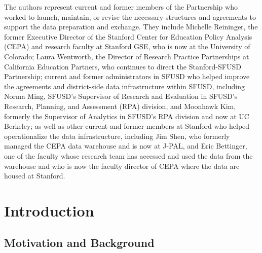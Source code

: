 The authors represent current and former members of the Partnership who worked to launch, maintain, or revise the necessary structures and agreements to support the data preparation and exchange. They include Michelle Reininger, the former Executive Director of the Stanford Center for Education Policy Analysis (CEPA) and research faculty at Stanford GSE, who is now at the University of Colorado; Laura Wentworth, the Director of Research Practice Partnerships at California Education Partners, who continues to direct the Stanford-SFUSD Partnership; current and former administrators in SFUSD who helped improve the agreements and district-side data infrastructure within SFUSD, including Norma Ming, SFUSD's Supervisor of Research and Evaluation in SFUSD's Research, Planning, and Assessment (RPA) division, and Moonhawk Kim, formerly the Supervisor of Analytics in SFUSD's RPA division and now at UC Berkeley; as well as other current and former members at Stanford who helped operationalize the data infrastructure, including Jim Shen, who formerly managed the CEPA data warehouse and is now at J-PAL, and Eric Bettinger, one of the faculty whose research team has accessed and used the data from the warehouse and who is now the faculty director of CEPA where the data are housed at Stanford.

\hypertarget{introduction-6}{%
\section{Introduction}\label{introduction-6}}

\hypertarget{motivation-and-background-4}{%
\subsection{Motivation and Background}\label{motivation-and-background-4}}

